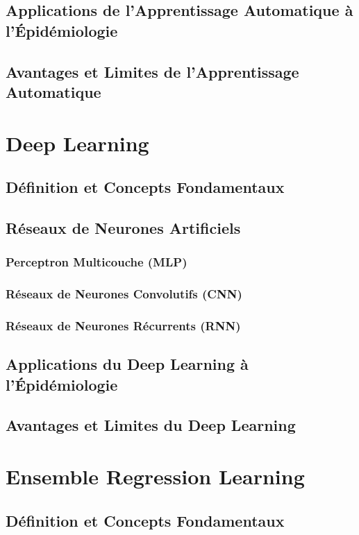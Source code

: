\subsection{Applications de l'Apprentissage Automatique à l'Épidémiologie}
\subsection{Avantages et Limites de l'Apprentissage Automatique}

\section{Deep Learning}
\subsection{Définition et Concepts Fondamentaux}
\subsection{Réseaux de Neurones Artificiels}
\subsubsection{Perceptron Multicouche (MLP)}
\subsubsection{Réseaux de Neurones Convolutifs (CNN)}
\subsubsection{Réseaux de Neurones Récurrents (RNN)}
\subsection{Applications du Deep Learning à l'Épidémiologie}
\subsection{Avantages et Limites du Deep Learning}

\section{Ensemble Regression Learning}
\subsection{Définition et Concepts Fondamentaux}
